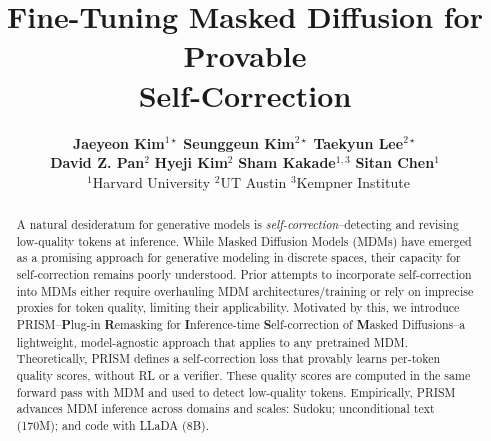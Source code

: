 \documentclass{article}
\title{Fine-Tuning Masked Diffusion for Provable\\ Self-Correction}
\author{%
\textbf{
\hspace{-17.1em}
Jaeyeon Kim}$^{1\star}$\xthanks{\hspace{-1.0em}$^\star$ Jaeyeon Kim and Seunggeun Kim contributed equally; 
Taekyun Lee is also a co–first author.} \quad\hspace{0.1em}
\textbf{Seunggeun Kim}$^{2\star}$ \quad\hspace{0.1em}
\textbf{Taekyun Lee}$^{2\star}$ \\
\hspace{-16.9em}
\textbf{David Z. Pan}$^{2}$ \quad\hspace{0.1em}
\textbf{Hyeji Kim}$^{2}$ \quad\hspace{0.1em}
\textbf{Sham Kakade}$^{1,3}$ \quad\hspace{0.1em}
\textbf{Sitan Chen}$^{1}$
\\[0.5ex]
\hspace{-17.2em}
~$^1$Harvard University \quad
$^2$UT Austin \quad
$^3$Kempner Institute
\vspace{-0.15in}
}
\begin{document}
\maketitle
\begin{abstract}
\vspace{-0.1in}
A natural desideratum for generative models is \emph{self-correction}--detecting and revising low-quality tokens at inference. While Masked Diffusion Models (MDMs) have emerged as a promising approach for generative modeling in discrete spaces, their capacity for self-correction remains poorly understood. Prior attempts to incorporate self-correction into MDMs either require overhauling MDM architectures/training or rely on imprecise proxies for token quality, limiting their applicability. Motivated by this, we introduce PRISM--{\bf P}lug-in {\bf R}emasking for {\bf I}nference-time {\bf S}elf-correction of {\bf M}asked Diffusions--a lightweight, model-agnostic approach that applies to any pretrained MDM. Theoretically, PRISM defines a self-correction loss that provably learns per-token quality scores, without RL or a verifier. These quality scores are computed in the same forward pass with MDM and used to detect low-quality tokens. Empirically, PRISM advances MDM inference across domains and scales: Sudoku; unconditional text (170M); and code with LLaDA (8B).
\vspace{-0.15in}
\end{abstract}





\newpage


\newpage
\appendix
\tableofcontents




\end{document}
